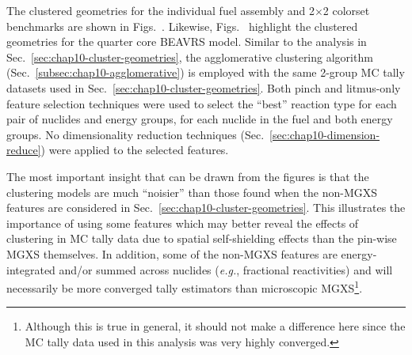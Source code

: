 \begin{appendices}
The clustered geometries for the individual fuel assembly and 2$\times$2 colorset benchmarks are shown in Figs.~. Likewise, Figs.~ highlight the clustered geometries for the quarter core \ac{BEAVRS} model. Similar to the analysis in Sec.~\ref{sec:chap10-cluster-geometries}, the agglomerative clustering algorithm (Sec.~\ref{subsec:chap10-agglomerative}) is employed with the same 2-group \ac{MC} tally datasets used in Sec.~\ref{sec:chap10-cluster-geometries}. Both pinch and litmus-only feature selection techniques were used to select the ``best'' reaction type for each pair of nuclides and energy groups, for each nuclide in the fuel and both energy groups. No dimensionality reduction techniques (Sec.~\ref{sec:chap10-dimension-reduce}) were applied to the selected features.

The most important insight that can be drawn from the figures is that the clustering models are much ``noisier'' than those found when the non-\ac{MGXS} features are considered in Sec.~\ref{sec:chap10-cluster-geometries}. This illustrates the importance of using some features which may better reveal the effects of clustering in \ac{MC} tally data due to spatial self-shielding effects than the pin-wise \ac{MGXS} themselves. In addition, some of the non-\ac{MGXS} features are energy-integrated and/or summed across nuclides (\textit{e.g.}, fractional reactivities) and will necessarily be more converged tally estimators than microscopic \ac{MGXS}\footnote{Although this is true in general, it should not make a difference here since the \ac{MC} tally data used in this analysis was very highly converged.}.


\end{appendices}
